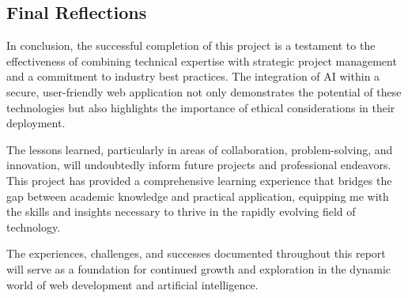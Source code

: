 \subsection{Final Reflections}
In conclusion, the successful completion of this project is a testament to the effectiveness of combining technical expertise with strategic project management and a commitment to industry best practices. The integration of \gls{AI} within a secure, user-friendly web application not only demonstrates the potential of these technologies but also highlights the importance of ethical considerations in their deployment.

The lessons learned, particularly in areas of collaboration, problem-solving, and innovation, will undoubtedly inform future projects and professional endeavors. This project has provided a comprehensive learning experience that bridges the gap between academic knowledge and practical application, equipping me with the skills and insights necessary to thrive in the rapidly evolving field of technology.

The experiences, challenges, and successes documented throughout this report will serve as a foundation for continued growth and exploration in the dynamic world of web development and artificial intelligence.

